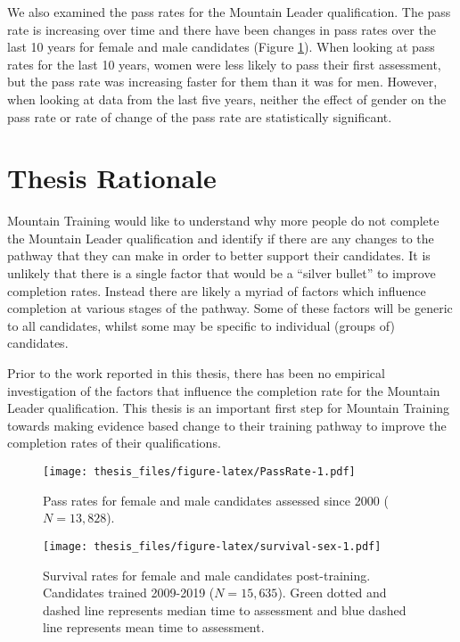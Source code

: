 \documentclass[
  12pt,
  a4paper,
]{book}
\begin{document}
We also examined the pass rates for the Mountain Leader qualification. The pass rate is increasing over time and there have been changes in pass rates over the last 10 years for female and male candidates (Figure \ref{fig:PassRate}). When looking at pass rates for the last 10 years, women were less likely to pass their first assessment, but the pass rate was increasing faster for them than it was for men. However, when looking at data from the last five years, neither the effect of gender on the pass rate or rate of change of the pass rate are statistically significant.

\hypertarget{thesis-rationale}{%
\section{Thesis Rationale}\label{thesis-rationale}}

Mountain Training would like to understand why more people do not complete the Mountain Leader qualification and identify if there are any changes to the pathway that they can make in order to better support their candidates. It is unlikely that there is a single factor that would be a ``silver bullet'' to improve completion rates. Instead there are likely a myriad of factors which influence completion at various stages of the pathway. Some of these factors will be generic to all candidates, whilst some may be specific to individual (groups of) candidates.

Prior to the work reported in this thesis, there has been no empirical investigation of the factors that influence the completion rate for the Mountain Leader qualification. This thesis is an important first step for Mountain Training towards making evidence based change to their training pathway to improve the completion rates of their qualifications.

\begin{figure}
\centering
\texttt{[image: thesis\_files/figure-latex/PassRate-1.pdf]}
\caption{\label{fig:PassRate}Pass rates for female and male candidates assessed since 2000 (\(N = 13,828\)).}
\end{figure}

\begin{figure}
\centering
\texttt{[image: thesis\_files/figure-latex/survival-sex-1.pdf]}
\caption{\label{fig:survival-sex}Survival rates for female and male candidates post-training. Candidates trained 2009-2019 (\(N = 15,635\)). Green dotted and dashed line represents median time to assessment and blue dashed line represents mean time to assessment.}
\end{figure}
\end{document}
